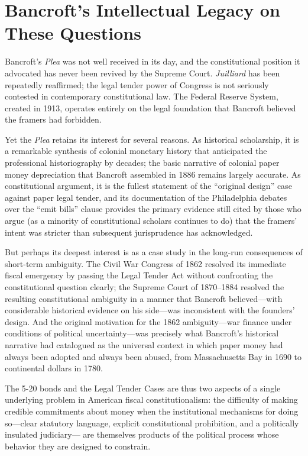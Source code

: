 \documentclass[12pt]{article}
\begin{document}
\section{Bancroft's Intellectual Legacy on These Questions}

Bancroft's \textit{Plea} was not well received in its day, and the
constitutional position it advocated has never been revived by the Supreme
Court. \textit{Juilliard} has been repeatedly reaffirmed; the legal tender
power of Congress is not seriously contested in contemporary constitutional
law. The Federal Reserve System, created in 1913, operates entirely on
the legal foundation that Bancroft believed the framers had forbidden.

Yet the \textit{Plea} retains its interest for several reasons. As
historical scholarship, it is a remarkable synthesis of colonial monetary
history that anticipated the professional historiography by decades; the
basic narrative of colonial paper money depreciation that Bancroft
assembled in 1886 remains largely accurate. As constitutional argument,
it is the fullest statement of the ``original design'' case against paper
legal tender, and its documentation of the Philadelphia debates over
the ``emit bills'' clause provides the primary evidence still cited by
those who argue (as a minority of constitutional scholars continues to do)
that the framers' intent was stricter than subsequent jurisprudence has
acknowledged.

But perhaps its deepest interest is as a case study in the long-run
consequences of short-term ambiguity. The Civil War Congress of 1862
resolved its immediate fiscal emergency by passing the Legal Tender Act
without confronting the constitutional question clearly; the Supreme Court
of 1870--1884 resolved the resulting constitutional ambiguity in a manner
that Bancroft believed---with considerable historical evidence on his
side---was inconsistent with the founders' design. And the original
motivation for the 1862 ambiguity---war finance under conditions of
political uncertainty---was precisely what Bancroft's historical narrative
had catalogued as the universal context in which paper money had always
been adopted and always been abused, from Massachusetts Bay in 1690
to continental dollars in 1780.

The 5-20 bonds and the Legal Tender Cases are thus two aspects of a
single underlying problem in American fiscal constitutionalism: the
difficulty of making credible commitments about money when the
institutional mechanisms for doing so---clear statutory language, explicit
constitutional prohibition, and a politically insulated judiciary---
are themselves products of the political process whose behavior they
are designed to constrain.
\end{document}
